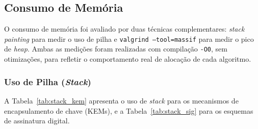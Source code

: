%

\subsection{Consumo de Memória}
\label{sec:res-memoria}

O consumo de memória foi avaliado por duas técnicas complementares:
\textit{stack painting} para medir o uso de pilha e
\texttt{valgrind --tool=massif} para medir o pico de \textit{heap}.
Ambas as medições foram realizadas com compilação \texttt{-O0},
sem otimizações, para refletir o comportamento real de alocação
de cada algoritmo.

\subsubsection{Uso de Pilha (\textit{Stack})}
\label{sec:res-stack}

A Tabela~\ref{tab:stack_kem} apresenta o uso de \textit{stack}
para os mecanismos de encapsulamento de chave (KEMs), e a
Tabela~\ref{tab:stack_sig} para os esquemas de assinatura digital.

\begin{table}[ht]
\centering
\caption{Uso de memória \textit{stack} por KEM e operação (bytes).
Medido via \textit{stack painting} com \texttt{pthread} de
4\,MB e compilação \texttt{-O0}.}
\label{tab:stack_kem}
\end{table}

